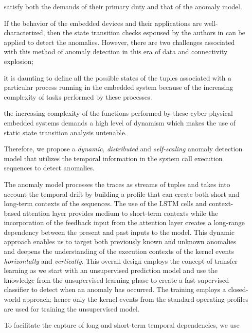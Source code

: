 satisfy both the demands of their primary duty and that of the anomaly model. 
\par  
If the behavior of the embedded devices and their applications are 
well-characterized, then the state transition checks espoused by the authors in 
\cite{sumner2013comparative,li2017locating} can be applied to detect the 
anomalies. However, there are two challenges associated with this method of 
anomaly detection in this era of data and connectivity explosion; 
\begin{enumerate*}[label={\alph*)},font={\bfseries}]
	\item it is daunting to define all the possible states of the tuples 
	associated with a particular process running in the embedded system because 
	of the increasing complexity of tasks performed by these processes.
	\item the increasing complexity of the functions \cite{ezeme2015multi} 
	performed by these cyber-physical embedded systems demands a high level of 
	dynamism which makes the use of static state transition analysis untenable.
\end{enumerate*}  
Therefore, we propose a \emph{dynamic, distributed} and \emph{self-scaling} 
anomaly detection model that utilizes the temporal information in the system 
call execution sequences to detect anomalies. 
\par  
The anomaly model processes the traces as streams of tuples and takes into 
account the temporal drift by building a profile that can create both short and 
long-term contexts of the sequences. The use of the LSTM cells and 
context-based attention layer provides medium to short-term contexts while the 
incorporation of the feedback input from the attention layer creates a 
long-range dependency between the present and past inputs to the model. This 
dynamic approach enables us to target both previously known and unknown 
anomalies and deepens the understanding of the execution contexts of the kernel 
events \emph{horizontally} and \emph{vertically}. This overall design employs 
the concept of transfer learning 
as we start with an unsupervised prediction model and use the knowledge from 
the unsupervised learning phase to create a fast supervised classifier to 
detect when an anomaly has occurred. The training employs a closed-world 
approach; hence only the kernel events from the standard operating profiles are 
used for training the unsupervised model.  \par
To facilitate the capture of long and short-term temporal dependencies, we use 
